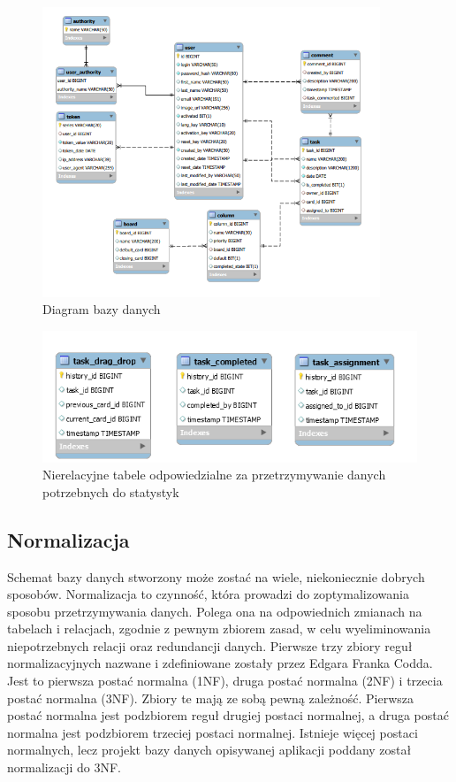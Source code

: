 \begin{figure}[h]
	\centering
	\includegraphics[width=0.90\textwidth]{diagram-bazy}
	
	\caption{ Diagram bazy danych}
	\label{projektdb}
\end{figure}


\begin{figure}[h]
	\centering
	\includegraphics[]{nierelacyjne}
	
	\caption{ Nierelacyjne tabele odpowiedzialne za przetrzymywanie danych potrzebnych do statystyk }
	\label{nierel}
\end{figure}
\clearpage
\subsection{Normalizacja}
Schemat bazy danych stworzony może zostać na wiele, niekoniecznie dobrych sposobów. Normalizacja to czynność, która prowadzi do zoptymalizowania sposobu przetrzymywania danych. Polega ona na odpowiednich zmianach na tabelach i relacjach, zgodnie z pewnym zbiorem zasad, w celu wyeliminowania niepotrzebnych relacji oraz redundancji danych. Pierwsze trzy zbiory reguł normalizacyjnych nazwane i zdefiniowane zostały przez Edgara Franka Codda. Jest to pierwsza postać normalna (1NF), druga postać normalna (2NF) i trzecia postać normalna (3NF). Zbiory te mają ze sobą pewną zależność. Pierwsza postać normalna jest podzbiorem reguł drugiej postaci normalnej, a druga postać normalna jest podzbiorem trzeciej postaci normalnej. Istnieje więcej postaci normalnych, lecz projekt bazy danych opisywanej aplikacji poddany został normalizacji do 3NF. \cite{db}


